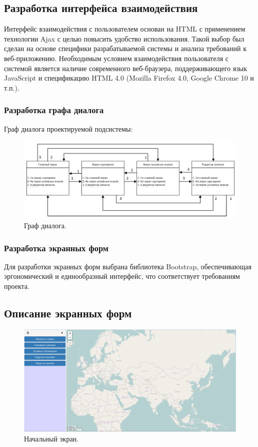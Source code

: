 \subsection{Разработка интерфейса взаимодействия}

Интерфейс взаимодействия с пользователем основан на HTML с применением
технологии Ajax с целью повысить удобство использования. Такой выбор был сделан на
основе специфики разрабатываемой системы и анализа требований к веб-приложению.
Необходимым условием взаимодействия пользователя с системой является наличие
современного веб-браузера, поддерживающего язык JavaScript и спецификацию HTML 4.0
(Mozilla Firefox 4.0, Google Chrome 10 и т.п.).

\subsubsection{Разработка графа диалога}

Граф диалога проектируемой подсистемы:

\begin{figure}[!h]
\centering
\includegraphics[width=\textwidth]{technology/graph}
\caption{Граф диалога.}
\label{figure:dialogGraph}
\end{figure}

\subsubsection{Разработка экранных форм}

Для разработки экранных форм выбрана библиотека Bootstrap, обеспечивающая эргономический и единообразный интерфейс, что соответствует требованиям проекта.

\subsection{Описание экранных форм}

\begin{figure}[!h]
\centering
\includegraphics[width=\textwidth]{technology/gui/1}
\caption{Начальный экран.}
\label{figure:gui1}
\end{figure}

